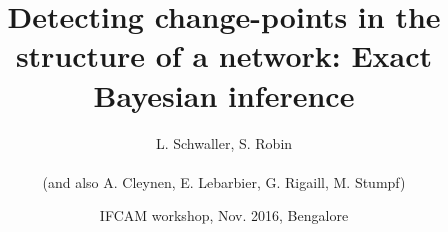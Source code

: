 \documentclass[10pt]{beamer}
\newcommand{\fignet}{/home/robin/Bureau/RECHERCHE/RESEAUX/EXPOSES/FIGURES}
\begin{document}

\title[Detecting change-points in the structure of a network]{Detecting change-points in the structure of a network: Exact Bayesian inference}

\author[S. Robin]{L. Schwaller, S. Robin \\ ~\\
    {\small (and also A. Cleynen, E. Lebarbier, G. Rigaill, M. Stumpf)}
  }


\date[Nov. 2016, Bengalore]{IFCAM workshop, Nov. 2016, Bengalore}

\maketitle

\end{document}
